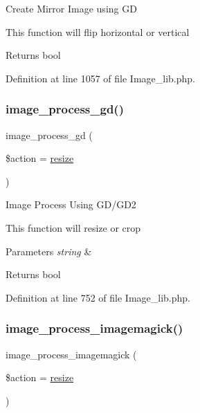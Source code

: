 Create Mirror Image using GD

This function will flip horizontal or vertical

\begin{DoxyReturn}{Returns}
bool 
\end{DoxyReturn}


Definition at line 1057 of file Image\+\_\+lib.\+php.

\mbox{\label{class_c_i___image__lib_aa8ef6ef7b931a663dd906ce27236c6fd}} 
\subsubsection{\texorpdfstring{image\_process\_gd()}{image\_process\_gd()}}
{\footnotesize\ttfamily image\+\_\+process\+\_\+gd (\begin{DoxyParamCaption}\item[{}]{\$action = {\ttfamily \textquotesingle{}\mbox{\hyperlink{class_c_i___image__lib_a94e38a7d478ce07200a52c51497e598e}{resize}}\textquotesingle{}} }\end{DoxyParamCaption})}

Image Process Using G\+D/\+G\+D2

This function will resize or crop


\begin{DoxyParams}{Parameters}
{\em string} & \\
\hline
\end{DoxyParams}
\begin{DoxyReturn}{Returns}
bool 
\end{DoxyReturn}


Definition at line 752 of file Image\+\_\+lib.\+php.

\mbox{\label{class_c_i___image__lib_a141ec7c2c7cbe7a9a6a913d12fe973da}} 
\subsubsection{\texorpdfstring{image\_process\_imagemagick()}{image\_process\_imagemagick()}}
{\footnotesize\ttfamily image\+\_\+process\+\_\+imagemagick (\begin{DoxyParamCaption}\item[{}]{\$action = {\ttfamily \textquotesingle{}\mbox{\hyperlink{class_c_i___image__lib_a94e38a7d478ce07200a52c51497e598e}{resize}}\textquotesingle{}} }\end{DoxyParamCaption})}


